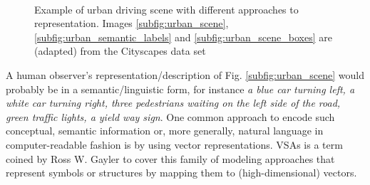 \begin{figure}[t!]
	\centering
	\\
	\caption{Example of urban driving scene with different approaches to representation. Images \ref{subfig:urban_scene}, \ref{subfig:urban_semantic_labels} and \ref{subfig:urban_scene_boxes} are (adapted) from the Cityscapes data set \cite{Cordts2016}}\label{fig:urban_scene}
\end{figure}
A human observer's representation/description of Fig. \ref{subfig:urban_scene} would probably be in a semantic/linguistic form, for instance \emph{a blue car turning left, a white car turning right, three pedestrians waiting on the left side of the road, green traffic lights, a yield way sign}.
One common approach to encode such conceptual, semantic information or, more generally, natural language in computer-readable fashion is by using vector representations.
\acfp{VSA} is a term coined by Ross W. Gayler \cite{Gayler2003} to cover this family of modeling approaches that represent symbols or structures by mapping them to (high-dimensional) vectors.


